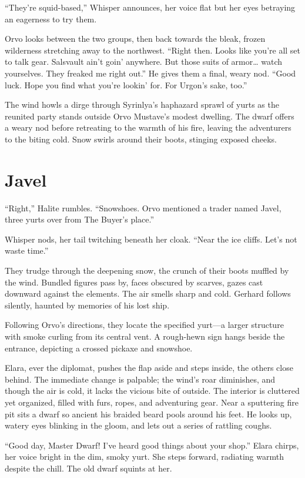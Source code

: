 \documentclass[
  letterpaper,12pt,twoside,twocolumn,openany,
  nodeprecatedcode,bg=full]{dndbook}
\begin{document}
``They're squid-based,'' Whisper announces, her voice flat but her eyes
betraying an eagerness to try them.

Orvo looks between the two groups, then back towards the bleak, frozen
wilderness stretching away to the northwest. ``Right then. Looks like
you're all set to talk gear. Salsvault ain't goin' anywhere. But those
suits of armor\ldots{} watch yourselves. They freaked me right out.'' He
gives them a final, weary nod. ``Good luck. Hope you find what you're
lookin' for. For Urgon's sake, too.''

The wind howls a dirge through Syrinlya's haphazard sprawl of yurts as
the reunited party stands outside Orvo Mustave's modest dwelling. The
dwarf offers a weary nod before retreating to the warmth of his fire,
leaving the adventurers to the biting cold. Snow swirls around their
boots, stinging exposed cheeks.

\section{Javel}\label{javel}

``Right,'' Halite rumbles. ``Snowshoes. Orvo mentioned a trader named
Javel, three yurts over from The Buyer's place.''

Whisper nods, her tail twitching beneath her cloak. ``Near the ice
cliffs. Let's not waste time.''

They trudge through the deepening snow, the crunch of their boots
muffled by the wind. Bundled figures pass by, faces obscured by scarves,
gazes cast downward against the elements. The air smells sharp and cold.
Gerhard follows silently, haunted by memories of his lost ship.

Following Orvo's directions, they locate the specified yurt---a larger
structure with smoke curling from its central vent. A rough-hewn sign
hangs beside the entrance, depicting a crossed pickaxe and snowshoe.

Elara, ever the diplomat, pushes the flap aside and steps inside, the
others close behind. The immediate change is palpable; the wind's roar
diminishes, and though the air is cold, it lacks the vicious bite of
outside. The interior is cluttered yet organized, filled with furs,
ropes, and adventuring gear. Near a sputtering fire pit sits a dwarf so
ancient his braided beard pools around his feet. He looks up, watery
eyes blinking in the gloom, and lets out a series of rattling coughs.

``Good day, Master Dwarf! I've heard good things about your shop.''
Elara chirps, her voice bright in the dim, smoky yurt. She steps
forward, radiating warmth despite the chill. The old dwarf squints at
her.
\end{document}
